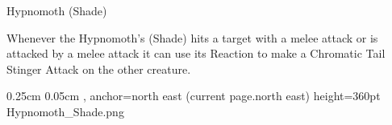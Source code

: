 \begin{DndMonster}[width=0.5\textwidth]{Hypnomoth (Shade)}
	\DndMonsterAttack[
		name=Chromatic Tail Stinger,
		distance=melee, %
		mod=+3,
		reach=5,
		targets=one target,
		dmg={\DndDice{1d4 + 3}},
		dmg-type=piercing,
	]
	
	Whenever the Hypnomoth's (Shade) hits a target with a melee attack or is attacked by a melee attack it can use its Reaction to make a Chromatic Tail Stinger Attack on the other creature.
\end{DndMonster}

\MonsterGraphicAndShortInfo{}%
{}%
{0.25cm}%
{0.05cm}%
{, anchor=north east}%
{(current page.north east)}%
{height=360pt}%
{Hypnomoth_Shade.png}%
%
\vspace*{-1.2\fontdimen6\font}
